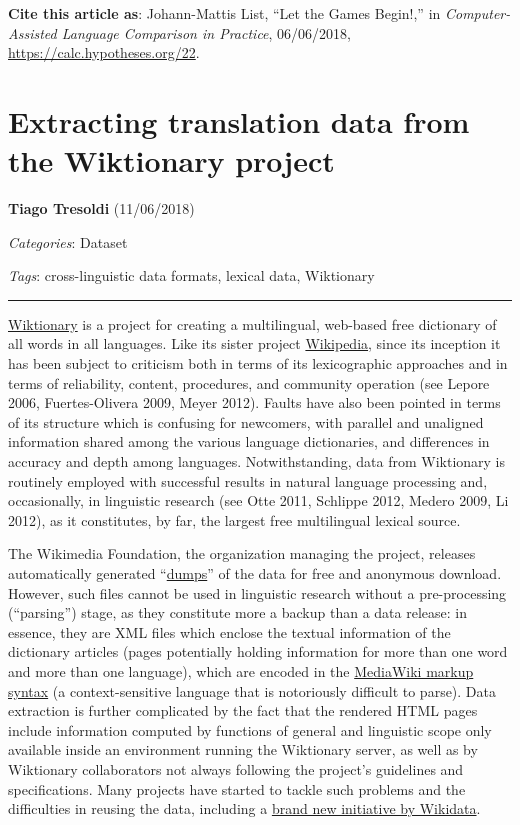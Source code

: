 \documentclass[
  english,
  a4paper,
  oneside,tablecaptionabove
]{scrbook}
\begin{document}
\textbf{Cite this article as}: Johann-Mattis List, ``Let the Games
Begin!,'' in \emph{Computer-Assisted Language Comparison in Practice},
06/06/2018, \url{https://calc.hypotheses.org/22}.

\hypertarget{extracting-translation-data-from-the-wiktionary-project}{%
\chapter{Extracting translation data from the Wiktionary
project}\label{extracting-translation-data-from-the-wiktionary-project}}

\textbf{Tiago Tresoldi} (11/06/2018)

\emph{Categories}: Dataset

\emph{Tags}: cross-linguistic data formats, lexical data, Wiktionary

\begin{center}\rule{0.5\linewidth}{\linethickness}\end{center}

\href{https://wiktionary.org}{Wiktionary} is a project for creating a
multilingual, web-based free dictionary of all words in all languages.
Like its sister project \href{https://wikipedia.org}{Wikipedia}, since
its inception it has been subject to criticism both in terms of its
lexicographic approaches and in terms of reliability, content,
procedures, and community operation (see Lepore 2006, Fuertes-Olivera
2009, Meyer 2012). Faults have also been pointed in terms of its
structure which is confusing for newcomers, with parallel and unaligned
information shared among the various language dictionaries, and
differences in accuracy and depth among languages. Notwithstanding, data
from Wiktionary is routinely employed with successful results in natural
language processing and, occasionally, in linguistic research (see Otte
2011, Schlippe 2012, Medero 2009, Li 2012), as it constitutes, by far,
the largest free multilingual lexical source.

The Wikimedia Foundation, the organization managing the project,
releases automatically generated
``\href{https://dumps.wikimedia.org/}{dumps}'' of the data for free and
anonymous download. However, such files cannot be used in linguistic
research without a pre-processing (\enquote{parsing}) stage, as they
constitute more a backup than a data release: in essence, they are XML
files which enclose the textual information of the dictionary articles
(pages potentially holding information for more than one word and more
than one language), which are encoded in the
\href{https://www.mediawiki.org/wiki/Markup_spec}{MediaWiki markup
syntax} (a context-sensitive language that is notoriously difficult to
parse). Data extraction is further complicated by the fact that the
rendered HTML pages include information computed by functions of general
and linguistic scope only available inside an environment running the
Wiktionary server, as well as by Wiktionary collaborators not always
following the project's guidelines and specifications. Many projects
have started to tackle such problems and the difficulties in reusing the
data, including a
\href{https://www.wikidata.org/wiki/Wikidata:Lexicographical_data}{brand
new initiative by Wikidata}.
\end{document}
